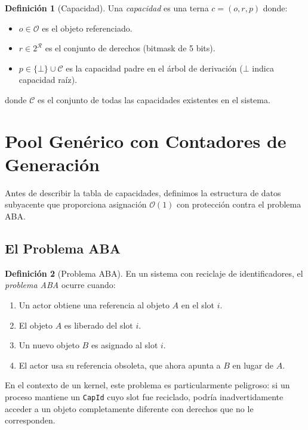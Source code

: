 \documentclass[11pt,twoside,openright]{book}
\theoremstyle{definition}
\newtheorem{definition}{Definición}[chapter]
\theoremstyle{plain}
\theoremstyle{remark}
\newcommand{\capid}{\texttt{CapId}}
\newcommand{\bigO}{\mathcal{O}}
\newcommand{\rights}{\mathcal{R}}
\begin{document}
\begin{definition}[Capacidad]
\label{def:cap-formal}
Una \emph{capacidad} es una terna $c = (o, r, p)$ donde:
\begin{itemize}
    \item $o \in \mathcal{O}$ es el objeto referenciado.
    \item $r \in 2^{\rights}$ es el conjunto de derechos (bitmask de 5 bits).
    \item $p \in \{\bot\} \cup \mathcal{C}$ es la capacidad padre en el árbol de derivación
          ($\bot$ indica capacidad raíz).
\end{itemize}
donde $\mathcal{C}$ es el conjunto de todas las capacidades existentes en el sistema.
\end{definition}

\section{Pool Genérico con Contadores de Generación}
\label{sec:pool}

Antes de describir la tabla de capacidades, definimos la estructura de datos subyacente
que proporciona asignación $\bigO(1)$ con protección contra el problema ABA.

\subsection{El Problema ABA}

\begin{definition}[Problema ABA]
\label{def:aba}
En un sistema con reciclaje de identificadores, el \emph{problema ABA} ocurre cuando:
\begin{enumerate}
    \item Un actor obtiene una referencia al objeto $A$ en el slot $i$.
    \item El objeto $A$ es liberado del slot $i$.
    \item Un nuevo objeto $B$ es asignado al slot $i$.
    \item El actor usa su referencia obsoleta, que ahora apunta a $B$ en lugar de $A$.
\end{enumerate}
\end{definition}

En el contexto de un kernel, este problema es particularmente peligroso: si un proceso
mantiene un \capid{} cuyo slot fue reciclado, podría inadvertidamente acceder a un
objeto completamente diferente con derechos que no le corresponden.
\end{document}

